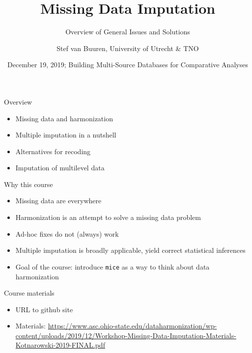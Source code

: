\documentclass[ignorenonframetext,aspectratio=43]{beamer}
\title{Missing Data Imputation}
\subtitle{Overview of General Issues and Solutions}
\author{Stef van Buuren, University of Utrecht \& TNO}
\date{December 19, 2019; Building Multi-Source Databases for Comparative
Analyses}
\providecommand{\tightlist}{%
  \setlength{\itemsep}{0pt}\setlength{\parskip}{0pt}}
\begin{document}
\frame{\titlepage}

\begin{frame}
\tableofcontents[hideallsubsections]
\end{frame}
\begin{frame}{Overview}
\protect\hypertarget{overview}{}

\begin{itemize}
\tightlist
\item
  Missing data and harmonization
\item
  Multiple imputation in a nutshell
\item
  Alternatives for recoding
\item
  Imputation of multilevel data
\end{itemize}

\end{frame}

\begin{frame}[fragile]{Why this course}
\protect\hypertarget{why-this-course}{}

\begin{itemize}
\tightlist
\item
  Missing data are everywhere
\item
  Harmonization is an attempt to solve a missing data problem
\item
  Ad-hoc fixes do not (always) work
\item
  Multiple imputation is broadly applicable, yield correct statistical
  inferences
\item
  Goal of the course: introduce \texttt{mice} as a way to think about
  data harmonization
\end{itemize}

\end{frame}

\begin{frame}{Course materials}
\protect\hypertarget{course-materials}{}

\begin{itemize}
\item
  URL to github site
\item
  Materials:
  \url{https://www.asc.ohio-state.edu/dataharmonization/wp-content/uploads/2019/12/Workshop-Missing-Data-Imputation-Materials-Kotnarowski-2019-FINAL.pdf}
\end{itemize}

\end{frame}
\end{document}

